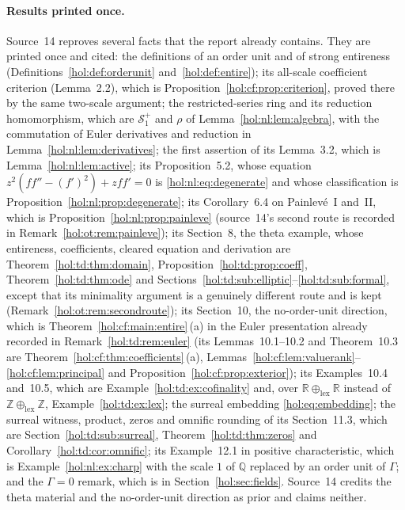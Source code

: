 \documentclass[11pt]{article}
\numberwithin{equation}{section}
\theoremstyle{definition}
\theoremstyle{remark}
\newcommand{\R}{\mathbb R}
\newcommand{\Q}{\mathbb Q}
\newcommand{\Z}{\mathbb Z}
\newcommand{\Sfam}{\mathcal S}
\begin{document}
\paragraph{Results printed once.}
Source~14 reproves several facts that the report already contains. They are
printed once and cited: the definitions of an order unit and of strong
entireness (Definitions~\ref{hol:def:orderunit} and~\ref{hol:def:entire});
its all-scale coefficient criterion (Lemma~2.2), which is
Proposition~\ref{hol:cf:prop:criterion}, proved there by the same two-scale
argument; the restricted-series ring and its reduction homomorphism, which are
$\Sfam_1^+$ and $\rho$ of Lemma~\ref{hol:nl:lem:algebra}, with the
commutation of Euler derivatives and reduction in
Lemma~\ref{hol:nl:lem:derivatives}; the first assertion of its Lemma~3.2,
which is Lemma~\ref{hol:nl:lem:active}; its Proposition~5.2, whose equation
$z^2(ff''-(f')^2)+zff'=0$ is \eqref{hol:nl:eq:degenerate} and whose
classification is Proposition~\ref{hol:nl:prop:degenerate}; its
Corollary~6.4 on Painlev\'e~I and~II, which is
Proposition~\ref{hol:nl:prop:painleve} (source~14's second route is recorded in
Remark~\ref{hol:ot:rem:painleve}); its Section~8, the theta example, whose
entireness, coefficients, cleared equation and derivation are
Theorem~\ref{hol:td:thm:domain}, Proposition~\ref{hol:td:prop:coeff},
Theorem~\ref{hol:td:thm:ode} and
Sections~\ref{hol:td:sub:elliptic}--\ref{hol:td:sub:formal}, except that its
minimality argument is a genuinely different route and is kept
(Remark~\ref{hol:ot:rem:secondroute}); its Section~10, the no-order-unit
direction, which is Theorem~\ref{hol:cf:main:entire}\,(a) in the Euler
presentation already recorded in Remark~\ref{hol:td:rem:euler} (its
Lemmas~10.1--10.2 and Theorem~10.3 are
Theorem~\ref{hol:cf:thm:coefficients}\,(a),
Lemmas~\ref{hol:cf:lem:valuerank}--\ref{hol:cf:lem:principal} and
Proposition~\ref{hol:cf:prop:exterior}); its Examples~10.4 and~10.5, which
are Example~\ref{hol:td:ex:cofinality} and, over $\R\oplus_{\mathrm{lex}}\R$
instead of $\Z\oplus_{\mathrm{lex}}\Z$, Example~\ref{hol:td:ex:lex}; the
surreal embedding \eqref{hol:eq:embedding}; the surreal witness, product,
zeros and omnific rounding of its Section~11.3, which are
Section~\ref{hol:td:sub:surreal}, Theorem~\ref{hol:td:thm:zeros} and
Corollary~\ref{hol:td:cor:omnific}; its Example~12.1 in positive
characteristic, which is Example~\ref{hol:nl:ex:charp} with the scale $1$ of
$\Q$ replaced by an order unit of $\Gamma$; and the $\Gamma=0$ remark, which
is in Section~\ref{hol:sec:fields}. Source~14 credits the theta material and
the no-order-unit direction as prior and claims neither.
\end{document}
